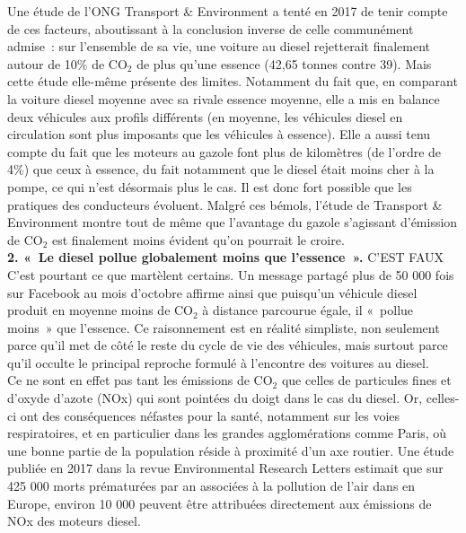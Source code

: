 \documentclass[8pt]{article}
\begin{document}
Une étude de l’ONG Transport \& Environment a tenté en 2017 de tenir compte de ces facteurs, aboutissant à la conclusion inverse de celle communément admise~: sur l’ensemble de sa vie, une voiture au diesel rejetterait finalement autour de 10\% de CO$_2$ de plus qu’une essence (42,65 tonnes contre 39).
Mais cette étude elle-même présente des limites. Notamment du fait que, en comparant la voiture diesel moyenne avec sa rivale essence moyenne, elle a mis en balance deux véhicules aux profils différents (en moyenne, les véhicules diesel en circulation sont plus imposants que les véhicules à essence). Elle a aussi tenu compte du fait que les moteurs au gazole font plus de kilomètres (de l’ordre de 4\%) que ceux à essence, du fait notamment que le diesel était moins cher à la pompe, ce qui n’est désormais plus le cas. Il est donc fort possible que les pratiques des conducteurs évoluent.
Malgré ces bémols, l’étude de Transport \& Environment montre tout de même que l’avantage du gazole s’agissant d’émission de CO$_2$ est finalement moins évident qu’on pourrait le croire.\\

\textbf{2. «~Le diesel pollue globalement moins que l’essence~».} C’EST FAUX\\

C’est pourtant ce que martèlent certains. Un message partagé plus de 50 000 fois sur Facebook au mois d’octobre affirme ainsi que puisqu’un véhicule diesel produit en moyenne moins de CO$_2$ à distance parcourue égale, il «~pollue moins~» que l’essence. Ce raisonnement est en réalité simpliste, non seulement parce qu’il met de côté le reste du cycle de vie des véhicules, mais surtout parce qu’il occulte le principal reproche formulé à l’encontre des voitures au diesel.\\

Ce ne sont en effet pas tant les émissions de CO$_2$ que celles de particules fines et d’oxyde d’azote (NOx) qui sont pointées du doigt dans le cas du diesel. Or, celles-ci ont des conséquences néfastes pour la santé, notamment sur les voies respiratoires, et en particulier dans les grandes agglomérations comme Paris, où une bonne partie de la population réside à proximité d’un axe routier.
Une étude publiée en 2017 dans la revue Environmental Research Letters estimait que sur 425 000 morts prématurées par an associées à la pollution de l’air dans en Europe, environ 10 000 peuvent être attribuées directement aux émissions de NOx des moteurs diesel.\\
\end{document}
